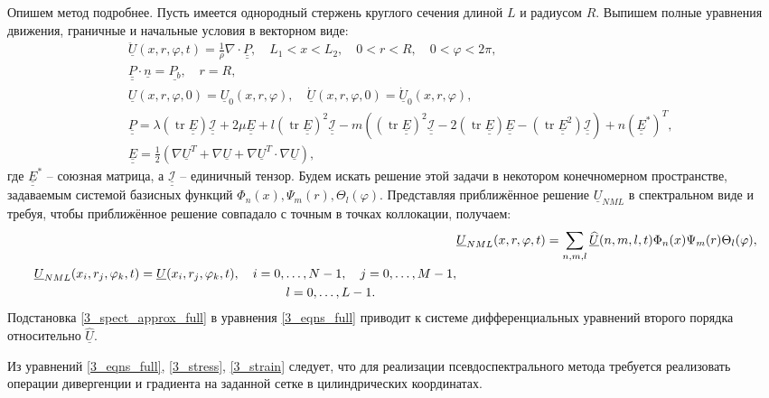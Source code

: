 \documentclass[12pt, a4paper]{report}
\DeclareMathOperator{\trace}{tr}
\newcommand{\lb}{\left (}
\newcommand{\rb}{\right )}
\newcommand{\vect}[1]{\underline{#1}}
\newcommand{\tens}[1]{\underline{\underline{#1}}}
\begin{document}
Опишем метод подробнее. Пусть имеется однородный стержень круглого сечения длиной $L$ и радиусом $R$.
Выпишем полные уравнения движения, граничные и начальные условия в векторном виде:
\begin{align}
\label{3_eqns_full}
&\ddot{\vect{U}}(x, r, \varphi, t) = \frac1\rho \nabla\cdot\tens{P},\quad L_1<x<L_2, \quad 0<r<R, \quad 0<\varphi<2\pi,\\
\label{3_bc_full}
&\tens{P} \cdot \vect{n} = \vect{P_b}, \quad r = R,\\
\label{3_iv_full}
&\vect{U}(x,r,\varphi,0) = \vect{U}_0(x,r,\varphi), \quad \vect{\dot U}(x,r,\varphi,0) = \vect{\dot U}_0(x,r,\varphi),\\
\label{3_stress}
&\tens{P} = \lambda \lb\trace{\tens{E}}\rb \tens{\mathcal{I}} + 2\mu \tens{E} + l \lb\trace{\tens{E}}\rb^2 \tens{\mathcal{I}} - m\lb \lb\trace{\tens{E}}\rb^2\tens{\mathcal{I}} - 2\lb\trace{\tens{E}}\rb\tens{E} - \lb\trace{\tens{E}^2}\rb\tens{\mathcal{I}}\rb + n\lb\tens{E}^*\rb^T,\\
\label{3_strain}
&\tens{E} = \frac12 \lb \nabla\vect{U}^T + \nabla\vect{U} + \nabla\vect{U}^T \cdot \nabla\vect{U} \rb,
\end{align}
где $\tens{E}^*$ -- союзная матрица, а $\tens{\mathcal{I}}$ -- единичный тензор.
Будем искать решение этой задачи в некотором конечномерном пространстве, задаваемым системой базисных функций $\Phi_n(x), \Psi_m(r), \Theta_l(\varphi)$. Представляя приближённое решение $\vect{U}_{NML}$ в спектральном виде и требуя, чтобы приближённое решение совпадало с точным в точках коллокации, получаем:
\begin{align}
\label{3_spect_approx_full}
&\vect{U}_{NML}(x,r,\varphi,t) = \sum_{n,m,l} \vect{\widehat{U}}(n,m,l,t) \Phi_n(x) \Psi_m(r) \Theta_l(\varphi),\\
\label{3_pseudo_sp_approx_full}
\begin{split}
&\vect{U}_{NML}(x_i, r_j, \varphi_k, t) = \vect{U}(x_i, r_j, \varphi_k, t), \quad i=0,\dots, N-1, \quad j=0,\dots, M-1,\\
&\hspace{70mm}l=0,\dots, L-1.
\end{split}
\end{align}
Подстановка \eqref{3_spect_approx_full} в уравнения \eqref{3_eqns_full} приводит к системе дифференциальных уравнений второго порядка относительно $\vect{\widehat{U}}$.

Из уравнений \eqref{3_eqns_full}, \eqref{3_stress}, \eqref{3_strain} следует, что для реализации псевдоспектрального метода требуется реализовать операции дивергенции и градиента на заданной сетке в цилиндрических координатах.
\end{document}
